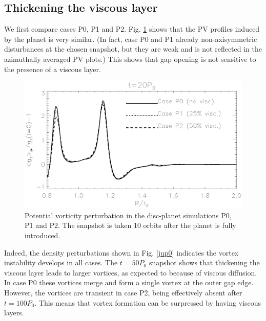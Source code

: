 \subsection{Thickening the viscous layer}
We first compare cases P0, P1 and P2. Fig. \ref{planet_gap} 
shows that the PV profiles induced by the planet is very
similar. (In fact, case P0 and P1 already non-axisymmetric
disturbances at the chosen snapshot, but they are weak and is not
reflected in the azimuthally averaged PV plots.) This shows that gap
opening is not sensitive to the presence of a viscous layer.  

\begin{figure}
  \centering
  \includegraphics[width=\linewidth]{figures/pdisk_vorten1d_cases_002.ps}
  \caption{Potential vorticity perturbation in the disc-planet
    simulations P0, P1 and P2. The snapshot is taken 10 orbits after
    the planet is fully introduced. %
    \label{planet_gap}}
\end{figure}

Indeed, the density perturbations shown in Fig. \ref{jup0} indicates the
vortex instability develops in all cases. The $t=50P_0$ 
snapshot shows that thickening the viscous layer leads to larger
vortices, as expected to because of viscous diffusion. In case P0
these vortices merge and form a single vortex at the outer gap edge.   
However, the vortices are transient in case P2, being effectively
absent after $t=100P_0$. This means that vortex formation can be
surpressed by having viscous layers. 


